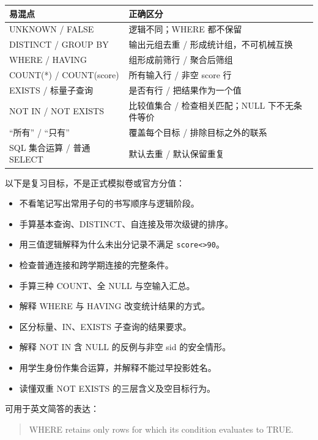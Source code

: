 \begin{longtable}[]{@{}ll@{}}
\toprule\noalign{}
易混点 & 正确区分 \\
\midrule\noalign{}
\endhead
\bottomrule\noalign{}
\endlastfoot
UNKNOWN / FALSE & 逻辑不同；WHERE 都不保留 \\
DISTINCT / GROUP BY & 输出元组去重 / 形成统计组，不可机械互换 \\
WHERE / HAVING & 组形成前筛行 / 聚合后筛组 \\
COUNT(*) / COUNT(score) & 所有输入行 / 非空 score 行 \\
EXISTS / 标量子查询 & 是否有行 / 把结果作为一个值 \\
NOT IN / NOT EXISTS & 比较值集合 / 检查相关匹配；NULL 下不无条件等价 \\
``所有'' / ``只有'' & 覆盖每个目标 / 排除目标之外的联系 \\
SQL 集合运算 / 普通 SELECT & 默认去重 / 默认保留重复 \\
\end{longtable}

以下是复习目标，不是正式模拟卷或官方分值：

\begin{itemize}
\tightlist
\item[$\square$]
  不看笔记写出常用子句的书写顺序与逻辑阶段。
\item[$\square$]
  手算基本查询、DISTINCT、自连接及带次级键的排序。
\item[$\square$]
  用三值逻辑解释为什么未出分记录不满足 \texttt{score\textless{}\textgreater{}90}。
\item[$\square$]
  检查普通连接和跨学期连接的完整条件。
\item[$\square$]
  手算三种 COUNT、全 NULL 与空输入汇总。
\item[$\square$]
  解释 WHERE 与 HAVING 改变统计结果的方式。
\item[$\square$]
  区分标量、IN、EXISTS 子查询的结果要求。
\item[$\square$]
  解释 NOT IN 含 NULL 的反例与非空 sid 的安全情形。
\item[$\square$]
  用学生身份作集合运算，并解释不能过早投影姓名。
\item[$\square$]
  读懂双重 NOT EXISTS 的三层含义及空目标行为。
\end{itemize}

可用于英文简答的表达：

\begin{quote}
WHERE retains only rows for which its condition evaluates to TRUE.
\end{quote}

